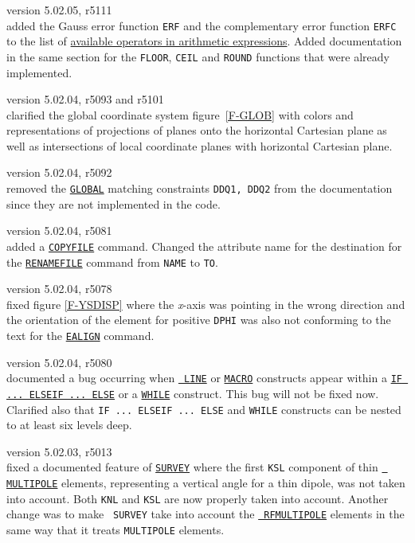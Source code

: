 \begin{madlist}
   version 5.02.05, r5111\\
  added the Gauss error function {\tt ERF} and the complementary error function 
  {\tt ERFC} to the list of \hyperref[subsec:operator]{available operators in 
  arithmetic expressions}. Added documentation in the same section for the 
  {\tt FLOOR}, {\tt CEIL} and {\tt ROUND} functions that were already 
  implemented. 
  
  
   version 5.02.04, r5093 and r5101\\
  clarified the global coordinate system figure~\ref{F-GLOB} with colors and 
  representations of projections of planes onto the horizontal Cartesian 
  plane as well as intersections of local coordinate planes with horizontal 
  Cartesian plane. 
  
  
   version 5.02.04, r5092\\
  removed the \hyperref[sec:global]{\tt GLOBAL} matching constraints {\tt DDQ1, 
  	DDQ2} from the documentation since they are not implemented in the code. 
  
  
   version 5.02.04, r5081\\
  added a \hyperref[sec:copyfile]{\tt COPYFILE} command. Changed the attribute 
  name for the destination for the \hyperref[sec:renamefile]{\tt RENAMEFILE} 
  command from {\tt NAME} to {\tt TO}.
  
  
   version 5.02.04, r5078\\
  fixed figure \ref{F-YSDISP} where the {\it x}-axis was pointing in
  the wrong direction and the orientation of the element for positive
  {\tt DPHI} was also not conforming to the text for the
  \hyperref[sec:ealign]{\tt EALIGN} command.
  
  
    version 5.02.04, r5080\\
  documented a bug occurring when \hyperref[sec:line]{\tt 
  LINE} or \hyperref[sec:macro]{\tt MACRO} 
  constructs appear within a \hyperref[sec:if]{\tt IF ... ELSEIF ... ELSE} or a 
  \hyperref[sec:while]{\tt WHILE} construct. This bug will not be fixed now. \\ 
  Clarified also that {\tt IF ... ELSEIF ... ELSE} and {\tt WHILE} constructs 
  can be nested to at least six levels deep.
  
  
   version 5.02.03, r5013\\
  fixed a documented feature of \hyperref[chap:survey]{\tt SURVEY} where
  the first {\tt KSL} component of thin \hyperref[sec:multipole]{\tt
  	MULTIPOLE} elements, representing a vertical angle for a thin
  dipole, was not taken into account. Both {\tt KNL} and {\tt KSL} are
  now properly taken into account. Another change was to make {\tt
  	SURVEY} take into account the \hyperref[sec:rfmultipole]{\tt
  	RFMULTIPOLE} elements in the same way that it treats {\tt MULTIPOLE}
  elements.
  

\end{madlist}
